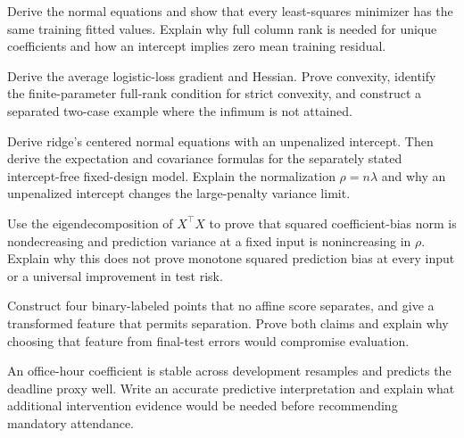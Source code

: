 \begin{challengeexercises}
\item {}Derive the normal equations and show that every least-squares minimizer has the same training fitted values. Explain why full column rank is needed for unique coefficients and how an intercept implies zero mean training residual.
\item {}Derive the average logistic-loss gradient and Hessian. Prove convexity, identify the finite-parameter full-rank condition for strict convexity, and construct a separated two-case example where the infimum is not attained.
\item {}Derive ridge's centered normal equations with an unpenalized intercept. Then derive the expectation and covariance formulas for the separately stated intercept-free fixed-design model. Explain the normalization $\rho=n\lambda$ and why an unpenalized intercept changes the large-penalty variance limit.
\item {}Use the eigendecomposition of $X^\top X$ to prove that squared coefficient-bias norm is nondecreasing and prediction variance at a fixed input is nonincreasing in $\rho$. Explain why this does not prove monotone squared prediction bias at every input or a universal improvement in test risk.
\item {}Construct four binary-labeled points that no affine score separates, and give a transformed feature that permits separation. Prove both claims and explain why choosing that feature from final-test errors would compromise evaluation.
\item {}An office-hour coefficient is stable across development resamples and predicts the deadline proxy well. Write an accurate predictive interpretation and explain what additional intervention evidence would be needed before recommending mandatory attendance.
\end{challengeexercises}

\clearpage
\begingroup\pagestyle{empty}\cleardoublepage\endgroup
\endgroup
